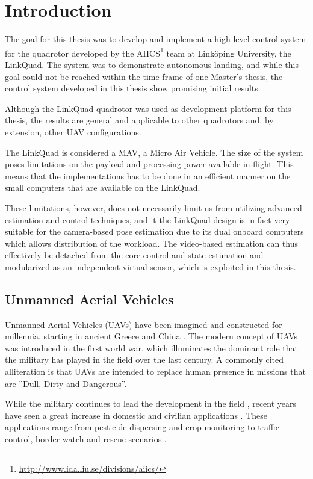 \chapter{Introduction}
\label{cha:introduction}
    The goal for this thesis was to develop and implement a high-level control system
    for the quadrotor developed by the AIICS\footnote{\url{http://www.ida.liu.se/divisions/aiics/}} team at Linköping University, the LinkQuad.
    The system was to demonstrate autonomous landing, and while this goal
    could not be reached within the time-frame of one Master's thesis, the control
    system developed in this thesis show promising initial results.

    Although the LinkQuad quadrotor was used as development platform for this thesis,
    the results are general and applicable to other quadrotors and, by extension, other UAV configurations.

    The LinkQuad is considered a MAV, a Micro Air Vehicle. %
    The size of the system poses limitations on the payload and processing power
    available in-flight. This means that the implementations has to be done
    in an efficient manner on the small computers that are available on the LinkQuad.

    These limitations, however, does not necessarily limit us from utilizing advanced estimation
    and control techniques, and it the LinkQuad design is in fact
    very suitable for the camera-based pose estimation due to its dual
    onboard computers which allows distribution of the workload.
    The video-based estimation can thus effectively be detached from the
    core control and state estimation and modularized as an independent
    virtual sensor, which is exploited in this thesis.

\section{Unmanned Aerial Vehicles}
    Unmanned Aerial Vehicles (UAVs) have been imagined and constructed for millennia, starting in ancient Greece and China \citep{valavanis2007advances}.
    The modern concept of UAVs was introduced in the first world war, which
    illuminates the dominant role that the military has played in the field over the
    last century. A commonly cited alliteration is that UAVs are intended to replace
    human presence in missions that are ''Dull, Dirty and Dangerous''.

    While the military continues to lead the development in the field \citep{united2010u}, recent years
    have seen a great increase in domestic and civilian applications \citep{Wong_Bil_2006}.
    These applications range from pesticide dispersing and crop monitoring to
    traffic control, border watch and rescue scenarios \citep{Doherty_Rudol_2007}.

